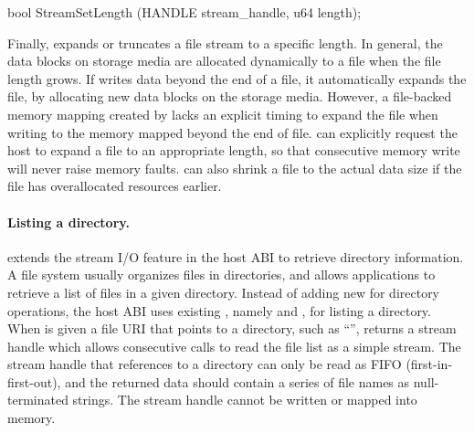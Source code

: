 \begin{paldef}
bool StreamSetLength (HANDLE stream_handle, u64 length);
\end{paldef}


Finally,  expands or truncates a file stream to a specific length.
In general, the data blocks on storage media are allocated dynamically
to a file when the file length grows.
If  writes data beyond the end of a file, it automatically expands the file, by allocating new data blocks on the storage media.
However, a file-backed memory mapping created by 
lacks an explicit timing to expand the file
when writing to the memory mapped beyond the end of file.
 can explicitly request the host to expand a file to an appropriate length,
so that consecutive memory write will never raise memory faults.
 can also shrink a file to the actual data size
if the file has overallocated resources earlier.










\paragraph{Listing a directory.}
\graphene{} extends the stream I/O feature in the host ABI to retrieve directory information.
A file system usually organizes files in directories,
and allows applications to retrieve a list of files in a given directory.
Instead of adding new \hostapis{} for directory operations,
the host ABI uses existing \hostapis{}, namely  and ,
for listing a directory.
When  is given a file URI that points to a directory,
such as ``'',
 returns a stream handle
which allows consecutive  calls to read the file list
as a simple stream.
The stream handle that references to a directory can only be read as FIFO (first-in-first-out),
and the returned data should contain a series of file names as null-terminated strings.
The stream handle cannot be written or mapped into memory.



